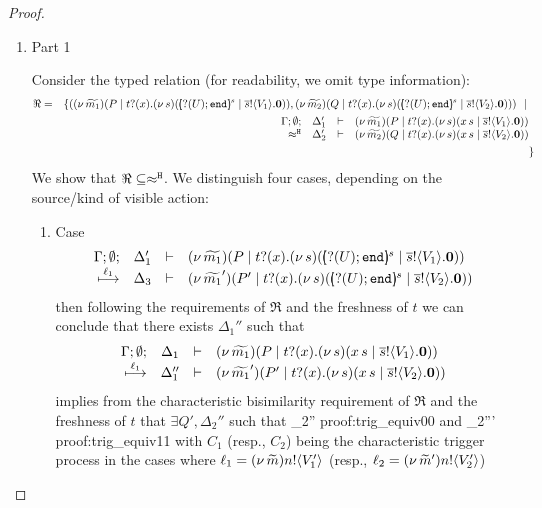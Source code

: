 \begin{proof}
	\begin{enumerate}
		\item	Part 1

				\noi Consider the typed relation (for readability, we omit type information):
				\begin{eqnarray*}
					\Re	&=&		\set{	(\newsp{\widetilde{m_1}}{P \Par \fotrigger{t}{x}{s}{\btinp{U} \tinact}{V_1} },
										\newsp{\widetilde{m_2}}{Q \Par \fotrigger{t}{x}{s}{\btinp{U} \tinact}{V_2}})
								\setbar\\
						&&			\mhorel{\Gamma}{\Delta_1'}{\newsp{\widetilde{m_1}}{P \Par \hotrigger{t}{x}{s}{V_1}}}
									{\hwb}
									{\Delta_2'}{}{\newsp{\widetilde{m_2}}{Q \Par \hotrigger{t}{x}{s}{V_2}}}
						\\
						&&		}
				\end{eqnarray*}
				We show that $\Re \subseteq \approx^\mathtt{H}$.
				We distinguish four cases, depending on the source/kind of visible action: 
				\begin{enumerate}
					\item	Case
						\[
							\mhorel{\Gamma}{\Delta_1'}{\newsp{\widetilde{m_1}}{P \Par \fotrigger{t}{x}{s}{\btinp{U} \tinact}{V_1} }}
							{\hby{\ell_1}}
							{\Delta_3}{}{\newsp{\widetilde{m_1}'}{P' \Par \fotrigger{t}{x}{s}{\btinp{U} \tinact}{V_2} }}
						\]
							then following the requirements of $\Re$ and the freshness of $t$
							we can conclude that there exists $\Delta_1''$ such that
						\[
							\begin{array}{rcll} \Gamma; \emptyset; &\Delta_1& \vdash& (\nu\, \widetilde{m_1})(P \;|\; t ? (x) . (\nu\, s)(x\, {s} \;|\; \overline{s} ! \langle V_1 \rangle . \mathbf{0}))\\ \stackrel{\ell_1}{\longmapsto} &\Delta_1''& \vdash &  (\nu\, \widetilde{m_1}')(P' \;|\; t ? (x) . (\nu\, s)(x\, {s} \;|\; \overline{s} ! \langle V_2 \rangle . \mathbf{0})) \end{array}
						\]
							implies from the characteristic bisimilarity requirement of $\Re$ and
							the freshness of $t$ that $\exists Q', \Delta_2''$ such that
							{}
							{\Delta_2''}{}
							{proof:trig_equiv00}
							and
							{\hwb}
							{\Delta_2'''}{}
							{proof:trig_equiv11}
							with $C_1$ (resp., $C_2$) being the characteristic trigger process
							in the cases where $\ell_1 = (\nu\, \widetilde{m}) n ! \langle V_1' \rangle$ (resp., $\ell_2 = (\nu\, \widetilde{m}') n ! \langle V_2' \rangle$)

\end{enumerate}
\end{enumerate}
\end{proof}
